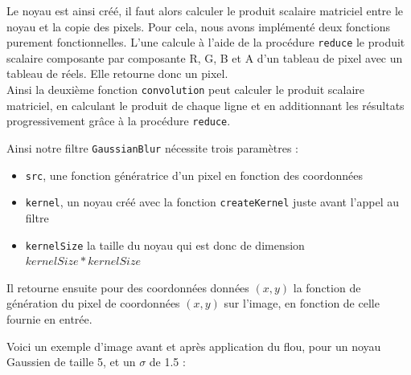 \documentclass[11pt]{article}
\begin{document}
Le noyau est ainsi créé, il faut alors calculer le produit scalaire matriciel entre le noyau et la copie des pixels. Pour cela, nous avons implémenté deux fonctions purement fonctionnelles. L'une calcule à l'aide de la procédure \texttt{reduce} le produit scalaire composante par composante R, G, B et A d'un tableau de pixel avec un tableau de réels. Elle retourne donc un pixel. \\
Ainsi la deuxième fonction \texttt{convolution} peut calculer le produit scalaire matriciel, en calculant le produit de chaque ligne et en additionnant les résultats progressivement grâce à la procédure \texttt{reduce}.

\noindent Ainsi notre filtre \texttt{GaussianBlur} nécessite trois paramètres :
\begin{itemize}
    \item \texttt{src}, une fonction génératrice d'un pixel en fonction des coordonnées
    \item \texttt{kernel}, un noyau créé avec la fonction \texttt{createKernel} juste avant l'appel au filtre
    \item \texttt{kernelSize} la taille du noyau qui est donc de dimension $kernelSize*kernelSize$
\end{itemize}

Il retourne ensuite pour des coordonnées données $(x,y)$ la fonction de génération du pixel de coordonnées $(x,y)$ sur l'image, en fonction de celle fournie en entrée.

Voici un exemple d'image avant et après application du flou, pour un noyau Gaussien de taille 5, et un $\sigma$ de 1.5 :
\end{document}
